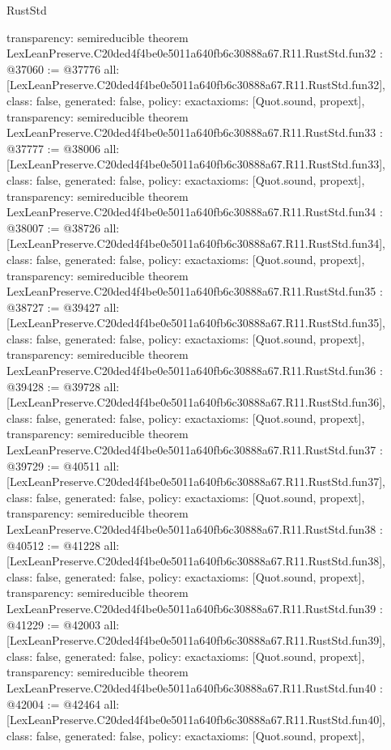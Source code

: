 \begin{lexlean}{RustStd}
\begin{coremodule}
{  transparency: semireducible
}
theorem LexLeanPreserve.C20ded4f4be0e5011a640fb6c30888a67.R11.RustStd.fun32 : @37060 := @37776 {
  all: [LexLeanPreserve.C20ded4f4be0e5011a640fb6c30888a67.R11.RustStd.fun32],
  class: false,
  generated: false,
  policy: exact{axioms: [Quot.sound, propext]},
  transparency: semireducible
}
theorem LexLeanPreserve.C20ded4f4be0e5011a640fb6c30888a67.R11.RustStd.fun33 : @37777 := @38006 {
  all: [LexLeanPreserve.C20ded4f4be0e5011a640fb6c30888a67.R11.RustStd.fun33],
  class: false,
  generated: false,
  policy: exact{axioms: [Quot.sound, propext]},
  transparency: semireducible
}
theorem LexLeanPreserve.C20ded4f4be0e5011a640fb6c30888a67.R11.RustStd.fun34 : @38007 := @38726 {
  all: [LexLeanPreserve.C20ded4f4be0e5011a640fb6c30888a67.R11.RustStd.fun34],
  class: false,
  generated: false,
  policy: exact{axioms: [Quot.sound, propext]},
  transparency: semireducible
}
theorem LexLeanPreserve.C20ded4f4be0e5011a640fb6c30888a67.R11.RustStd.fun35 : @38727 := @39427 {
  all: [LexLeanPreserve.C20ded4f4be0e5011a640fb6c30888a67.R11.RustStd.fun35],
  class: false,
  generated: false,
  policy: exact{axioms: [Quot.sound, propext]},
  transparency: semireducible
}
theorem LexLeanPreserve.C20ded4f4be0e5011a640fb6c30888a67.R11.RustStd.fun36 : @39428 := @39728 {
  all: [LexLeanPreserve.C20ded4f4be0e5011a640fb6c30888a67.R11.RustStd.fun36],
  class: false,
  generated: false,
  policy: exact{axioms: [Quot.sound, propext]},
  transparency: semireducible
}
theorem LexLeanPreserve.C20ded4f4be0e5011a640fb6c30888a67.R11.RustStd.fun37 : @39729 := @40511 {
  all: [LexLeanPreserve.C20ded4f4be0e5011a640fb6c30888a67.R11.RustStd.fun37],
  class: false,
  generated: false,
  policy: exact{axioms: [Quot.sound, propext]},
  transparency: semireducible
}
theorem LexLeanPreserve.C20ded4f4be0e5011a640fb6c30888a67.R11.RustStd.fun38 : @40512 := @41228 {
  all: [LexLeanPreserve.C20ded4f4be0e5011a640fb6c30888a67.R11.RustStd.fun38],
  class: false,
  generated: false,
  policy: exact{axioms: [Quot.sound, propext]},
  transparency: semireducible
}
theorem LexLeanPreserve.C20ded4f4be0e5011a640fb6c30888a67.R11.RustStd.fun39 : @41229 := @42003 {
  all: [LexLeanPreserve.C20ded4f4be0e5011a640fb6c30888a67.R11.RustStd.fun39],
  class: false,
  generated: false,
  policy: exact{axioms: [Quot.sound, propext]},
  transparency: semireducible
}
theorem LexLeanPreserve.C20ded4f4be0e5011a640fb6c30888a67.R11.RustStd.fun40 : @42004 := @42464 {
  all: [LexLeanPreserve.C20ded4f4be0e5011a640fb6c30888a67.R11.RustStd.fun40],
  class: false,
  generated: false,
  policy: exact{axioms: [Quot.sound, propext]},
}
\end{coremodule}
\end{lexlean}
